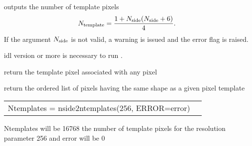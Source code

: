 \begin{codedescription}
{\facname outputs the number of template pixels
  $${N_{\rm template}}=\frac{1+{N_{\rm side}}({N_{\rm side}}+6)}{4}.$$ If the argument ${N_{\rm side}}$ is not
  valid, a  warning is issued and the error flag is raised.}
\end{codedescription}



\begin{related}
  \begin{sulist}{} %
    \item[idl] version \idlversion or more is necessary to run \facname.	
  \item[\htmlref{template\_pixel\_ring}{idl:template_pixel_xxx}]
  \item[\htmlref{template\_pixel\_nest}{idl:template_pixel_xxx}] return the
  template pixel associated with any \healpix pixel
  \item[\htmlref{same\_shape\_pixels\_ring}{idl:same_shape_pixels_xxx}] 
  \item[\htmlref{same\_shape\_pixels\_nest}{idl:same_shape_pixels_xxx}] 
  return
  the ordered list of pixels having the same shape as a given pixel template
  \end{sulist}
\end{related}

\begin{example}
{
\begin{tabular}{ll} %
Ntemplates = nside2ntemplates(256, ERROR=error)
\end{tabular}
}
{
Ntemplates will be 16768 the number of template pixels for the \healpix
resolution parameter 256 and error will be 0}
\end{example}

